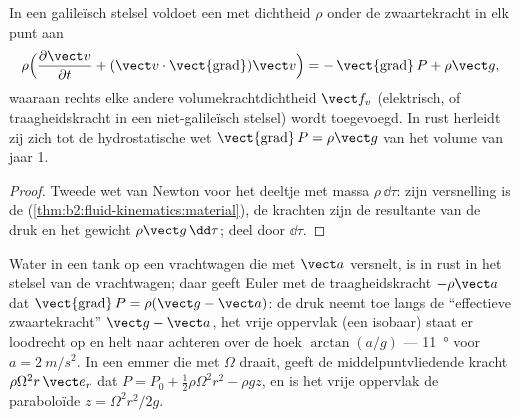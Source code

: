\begin{theorem}\label{thm:b2:euler-bernoulli:euler}
In een galileïsch stelsel voldoet een  met dichtheid $\rho$
onder de zwaartekracht in elk punt aan
\[
\rho\Bigl(\frac{\partial\vect v}{\partial t} + (\vect v\cdot\operatorname{\vect{grad}})
\vect v\Bigr) = -\operatorname{\vect{grad}}P + \rho\vect g ,
\]
waaraan rechts elke andere volumekrachtdichtheid $\vect f_v$ (elektrisch, of
traagheidskracht in een niet-galileïsch stelsel) wordt toegevoegd. In rust
herleidt zij zich tot de hydrostatische wet
$\operatorname{\vect{grad}}P = \rho\vect g$ van het volume van jaar 1.
\end{theorem}

\begin{proof}
Tweede wet van Newton voor het deeltje met massa $\rho\,\dd\tau$: zijn
versnelling is de 
(\cref{thm:b2:fluid-kinematics:material}), de krachten zijn de resultante
van de druk en het gewicht $\rho\vect g\,\dd\tau$; deel door $\dd\tau$.
\end{proof}

\begin{example}\label{ex:b2:euler-bernoulli:tank}
Water in een tank op een vrachtwagen die met $\vect a$ versnelt, is in rust
in het stelsel van de vrachtwagen; daar geeft Euler met de traagheidskracht
$-\rho\vect a$ dat $\operatorname{\vect{grad}}P = \rho(\vect g - \vect a)$:
de druk neemt toe langs de ``effectieve zwaartekracht'' $\vect g - \vect a$,
het vrije oppervlak (een isobaar) staat er loodrecht op en helt naar
achteren over de hoek $\arctan(a/g)$ --- \qty{11}{\degree} voor
$a = \qty{2}{m/s^2}$. In een emmer die met $\Omega$ draait, geeft de
middelpuntvliedende kracht $\rho\Omega^2r\,\vect e_r$ dat
$P = P_0 + \tfrac12\rho\Omega^2r^2 - \rho gz$, en is het vrije oppervlak de
paraboloïde $z = \Omega^2r^2/2g$.
\end{example}


